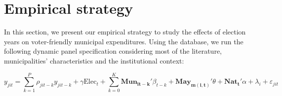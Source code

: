 \section{Empirical strategy}

In this section, we present our empirical strategy to study the effects of election years on voter-friendly municipal expenditures. Using the database, we run the following dynamic panel specification considering most of the literature, municipalities' characteristics and the institutional context: 

\begin{equation}\label{eq:main_specification}
	y_{jit} = \sum_{k=1}^{P} \rho_{jit-k} y_{jit-k} + \gamma \text{Elec}_t + \sum_{k=0}^{K} \mathbf{Mun_{it-k}'}\beta_{t-k} + \mathbf{May_{m(i,t)}'}\theta + \mathbf{Nat_{t}'}\alpha + \lambda_i + \varepsilon_{jit}
\end{equation}

